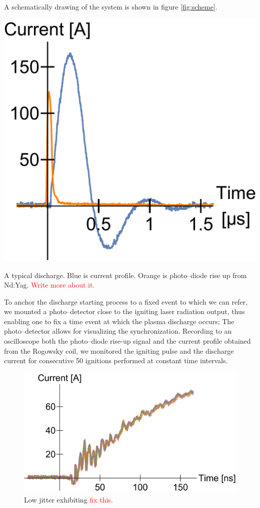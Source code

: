 \documentclass[justified,nofonts,nobib,openany]{tufte-book}
\begin{document}
A schematically drawing of the system is shown in figure \ref{fig:scheme}.
\begin{marginfigure}
    \includegraphics[width=\marginparwidth]{figures/jitter/discharge_sample.pdf}
    \caption{A typical discharge. Blue is current profile. Orange is photo--diode rise up from Nd:Yag. \textcolor{red}{Write more about it.}}
    \label{fig:discharge_sample}
\end{marginfigure}
To anchor the discharge starting process to a fixed event to which we can refer, we mounted a photo--detector close to the igniting laser radiation output, thus enabling one to fix a time event at which the plasma discharge occurs; The photo--detector allows for visualizing the synchronization. Recording to an oscilloscope both the photo--diode rise-up signal and the current profile obtained from the Rogowsky coil, we monitored the igniting pulse and the discharge current for consecutive 50 ignitions performed at constant time intervals.
\begin{figure}
    \centering
    \includegraphics[width=\textwidth]{figures/jitter/low_jitter.pdf}
    \caption{Low jitter exhibiting \textcolor{red}{fix this.}}
    \label{fig:low_jitter}
\end{figure}
\end{document}
